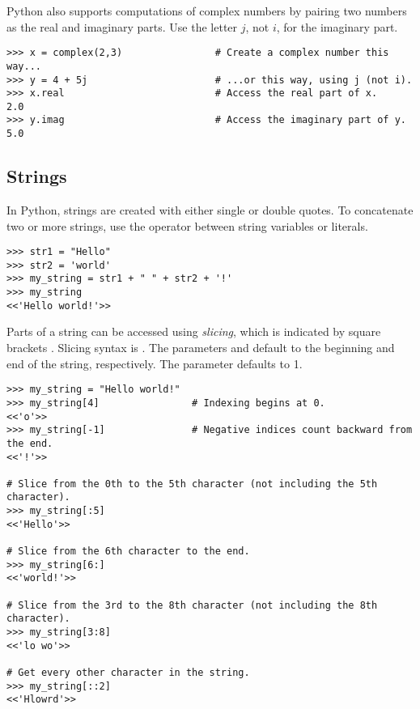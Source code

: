 Python also supports computations of complex numbers by pairing two numbers as the real and imaginary parts.
Use the letter $j$, not $i$, for the imaginary part.
\begin{lstlisting}
>>> x = complex(2,3)                # Create a complex number this way...
>>> y = 4 + 5j	                    # ...or this way, using j (not i).
>>> x.real                          # Access the real part of x.
2.0
>>> y.imag                          # Access the imaginary part of y.
5.0
\end{lstlisting}

\subsection*{Strings} %

In Python, strings are created with either single or double quotes.
To concatenate two or more strings, use the \li{+} operator between string variables or literals.
\begin{lstlisting}
>>> str1 = "Hello"
>>> str2 = 'world'
>>> my_string = str1 + " " + str2 + '!'
>>> my_string
<<'Hello world!'>>
\end{lstlisting}

Parts of a string can be accessed using \emph{slicing}, which is indicated by square brackets \li{[ ]}.
Slicing syntax is .
The parameters  and  default to the beginning and end of the string, respectively.
The parameter  defaults to 1.

\begin{lstlisting}
>>> my_string = "Hello world!"
>>> my_string[4]                # Indexing begins at 0.
<<'o'>>
>>> my_string[-1]               # Negative indices count backward from the end.
<<'!'>>

# Slice from the 0th to the 5th character (not including the 5th character).
>>> my_string[:5]
<<'Hello'>>

# Slice from the 6th character to the end.
>>> my_string[6:]
<<'world!'>>

# Slice from the 3rd to the 8th character (not including the 8th character).
>>> my_string[3:8]
<<'lo wo'>>

# Get every other character in the string.
>>> my_string[::2]
<<'Hlowrd'>>
\end{lstlisting}

